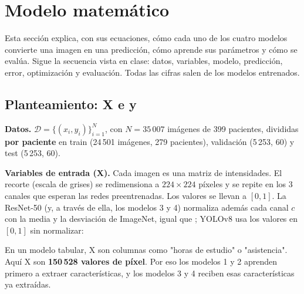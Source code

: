 \section{Modelo matemático}
\label{sec:matematico}

Esta sección explica, con sus ecuaciones, cómo cada uno de los cuatro modelos convierte una imagen en una predicción, cómo aprende sus parámetros y cómo se evalúa. Sigue la secuencia vista en clase: datos, variables, modelo, predicción, error, optimización y evaluación. Todas las cifras salen de los modelos entrenados.


\subsection{Planteamiento: X e y}
\label{mm:1}

\textbf{Datos.} $\mathcal{D} = \lbrace (x_i, y_i)\rbrace _{i=1}^{N}$, con $N = 35\,007$ imágenes de 399 pacientes, divididas \textbf{por paciente} en train (24\,501 imágenes, 279 pacientes), validación (5\,253, 60) y test (5\,253, 60).

\textbf{Variables de entrada (X).} Cada imagen es una matriz de intensidades. El recorte (escala de grises) se redimensiona a $224 \times 224$ píxeles y se repite en los 3 canales que esperan las redes preentrenadas. Los valores se llevan a $[0, 1]$. La ResNet-50 (y, a través de ella, los modelos 3 y 4) normaliza además cada canal $c$ con la media y la desviación de ImageNet, igual que ; YOLOv8 usa los valores en $[0, 1]$ sin normalizar:

\begin{center}
\end{center}

En un modelo tabular, X son columnas como "horas de estudio" o "asistencia". Aquí X son \textbf{150\,528 valores de píxel}. Por eso los modelos 1 y 2 aprenden primero a extraer características, y los modelos 3 y 4 reciben esas características ya extraídas.

